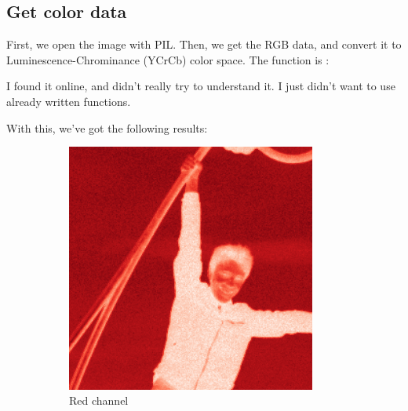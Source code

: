 \subsection{Get color data}

First, we open the image with PIL.
Then, we get the RGB data, and convert it to Luminescence-Chrominance (YCrCb) color space.
The function  is :


I found it online, and didn't really try to understand it.
I just didn't want to use already written functions.

With this, we've got the following results:

\begin{figure}[H]
    \centering
    \begin{subfigure}[b]{0.3\textwidth}
        \centering
        \includegraphics[width=0.9\textwidth]{src/assets/tests/red.png}
        \caption{Red channel}
        \label{fig:tests-red}
    \end{subfigure}
    \begin{subfigure}[b]{0.3\textwidth}
        \centering

\end{subfigure}
\end{figure}
